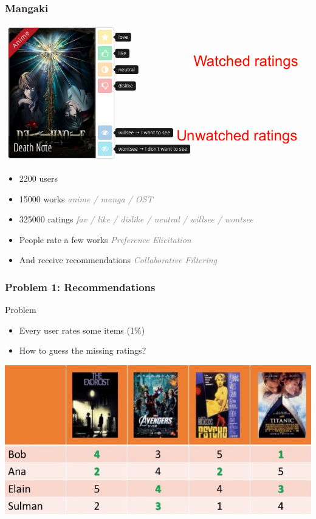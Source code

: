 \documentclass[]{beamer}
\begin{document}
\newcommand\discrete[1]{\textcolor{gray}{\hfill {\em \small #1}}}

\begin{frame}
  \frametitle{Mangaki}
    \includegraphics[width=\textwidth]{figures/ratings.jpg}
  \begin{itemize}
  \item 2200 users
  \item 15000 works \discrete{anime / manga / OST}
  \item 325000 ratings \discrete{fav / like / dislike / neutral / willsee / wontsee}
  \item People rate a few works \discrete{Preference Elicitation}
  \item And receive recommendations \discrete{Collaborative Filtering}
  \end{itemize}
\end{frame}

\begin{frame}
	\frametitle{Problem 1: Recommendations}
	\begin{block}{Problem}
		\begin{itemize}
		\item Every user rates some items (1\%)
    \item How to guess the missing ratings?
		\end{itemize}
    \vspace{-2mm}
	\end{block}
  \includegraphics[width=\linewidth]{figures/cf.jpg}
\end{frame}
\end{document}
